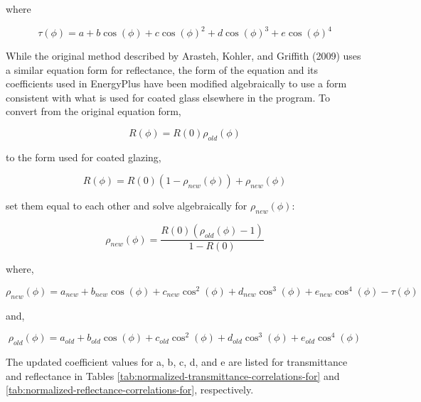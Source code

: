 where

\begin{equation}
  \tau(\phi) = a + b\cos (\phi ) + c\cos {(\phi )^2} + d\cos {(\phi )^3} + e\cos {(\phi )^4}
\end{equation}

While the original method described by Arasteh, Kohler, and Griffith (2009) uses a similar equation form for reflectance, the form of the equation and its coefficients used in EnergyPlus have been modified algebraically to use a form consistent with what is used for coated glass elsewhere in the program. To convert from the original equation form,

\begin{equation}
  R(\phi) = R(0)\rho_{old}(\phi)
\end{equation}

to the form used for coated glazing,

\begin{equation}
  R(\phi ) = R(0)(1 - \rho_{new}(\phi )) + \rho_{new}(\phi )
\end{equation}

set them equal to each other and solve algebraically for $\rho_{new}(\phi )$:

\begin{equation}
  \rho_{new}(\phi ) = \frac{R(0)\left(\rho_{old}(\phi ) - 1\right)}{1 - R(0)}
\end{equation}

where,

\begin{equation}
  \rho_{new}(\phi ) = a_{new} + b_{new}\cos (\phi ) + c_{new}{\cos ^2}(\phi ) + d_{new}{\cos ^3}(\phi ) + e_{new}{\cos ^4}(\phi ) - \tau (\phi )
\end{equation}

and,

\begin{equation}
  \rho_{old}(\phi ) = a_{old} + b_{old}\cos (\phi ) + c_{old}{\cos ^2}(\phi ) + d_{old}{\cos ^3}(\phi ) + e_{old}{\cos ^4}(\phi )
\end{equation}

The updated coefficient values for a, b, c, d, and e are listed for transmittance and reflectance in Tables \ref{tab:normalized-transmittance-correlations-for} and \ref{tab:normalized-reflectance-correlations-for}, respectively.

